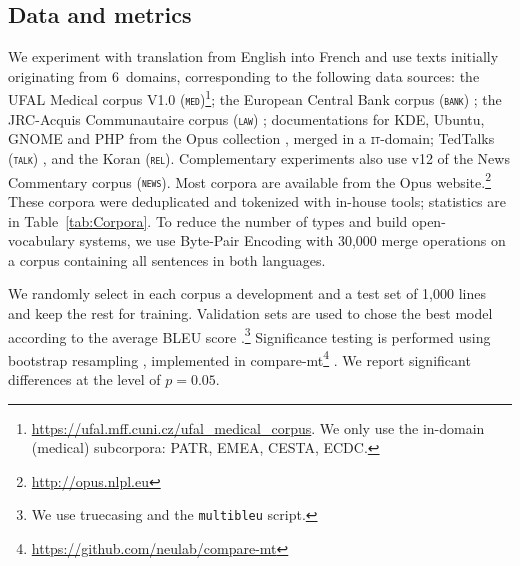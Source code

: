 \documentclass[11pt]{article}
\newcommand{\fyDone}[1]{\done[FY]\Todo[FY:]{\textcolor{orange}{#1}}}
\newcommand{\domain}[1]{\texttt{\textsc{#1}}}
\begin{document}
\subsection{Data and metrics \label{ssec:corpora}}
We experiment with translation from English into French and use texts initially originating from 6~domains, corresponding to the following data sources: the UFAL Medical corpus V1.0 (\domain{med})\footnote{\url{https://ufal.mff.cuni.cz/ufal_medical_corpus}. We only use the in-domain (medical) subcorpora: PATR, EMEA, CESTA, ECDC.}; the European Central Bank corpus (\domain{bank}) \cite{Tiedemann12parallel}; the JRC-Acquis Communautaire corpus (\domain{law}) \cite{Steinberger06acquis}; documentations for KDE, Ubuntu, GNOME and PHP from the Opus collection \cite{Tiedemann09news}, merged in a \domain{it}-domain; TedTalks (\domain{talk}) \cite{Cettolo12wit}, and the Koran (\domain{rel}). Complementary experiments also use v12 of the News Commentary corpus (\domain{news}). Most corpora are available from the Opus website.\footnote{\url{http://opus.nlpl.eu}} These corpora were deduplicated and tokenized with in-house tools; statistics are in Table~\ref{tab:Corpora}. To reduce the number of types and build open-vocabulary systems, we use Byte-Pair Encoding \cite{Sennrich16BPE} with 30,000 merge operations on a corpus containing all sentences in both languages.\fyDone{Add \# number of tokens, also specificity ?}%

We randomly select in each corpus a development and a test set of 1,000 lines and keep the rest for training. Validation sets are used to chose the best model according to the average BLEU score \cite{Papineni02bleu}.\footnote{We use truecasing and the \texttt{multibleu} script.}\fyDone{A word about meta-parameter settings} Significance testing is performed using bootstrap resampling \cite{Koehn04statistical}, implemented in compare-mt\footnote{\url{https://github.com/neulab/compare-mt}} \cite{Neubig19compare-mt}. We report significant differences at the level of $p=0.05$.\fyDone{Fix correct p value}
\end{document}
